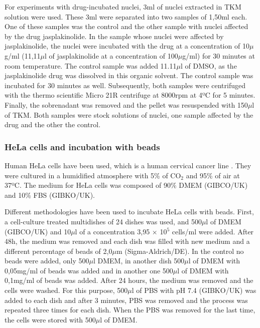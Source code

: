 \documentclass[12pt, a4paper]{article} %
\begin{document}
For experiments with drug-incubated nuclei, 3ml of nuclei extracted in TKM solution were used. These 3ml were separated into two samples of 1,50ml each. One of these samples was the control and the other sample with nuclei affected by the drug jasplakinolide. In the sample whose nuclei were affected by jasplakinolide, the nuclei were incubated with the drug at a concentration of 10$\mu$g/ml (11,11$\mu$l of jasplakinolide at a concentration of 100$\mu$g/ml) for 30 minutes at room temperature. The control sample was added 11.11$\mu$l of DMSO, as the jasplakinolide drug was dissolved in this organic solvent. The control sample was incubated for 30 minutes as well. Subsequently, both samples were centrifuged with the thermo scientific Micro 21R centrifuge at 8000rpm at 4ºC for 5 minutes. Finally, the sobrenadant was removed and the pellet was resuspended with 150$\mu$l of TKM. Both samples were stock solutions of nuclei, one sample affected by the drug and the other the control.

\setlength{\parskip}{0mm}

\subsubsection{HeLa cells and incubation with beads}

Human HeLa cells have been used, which is a human cervical cancer line \cite{gey1952tissue}. They were cultured in a humidified atmosphere with 5\% of CO$_{2}$ and 95\% of air at 37ºC. The medium for HeLa cells was composed of 90\% DMEM (GIBCO/UK) and 10\% FBS (GIBKO/UK).

\setlength{\parskip}{4mm}

Different methodologies have been used to incubate HeLa cells with beads. First, a cell-culture treated multidishes of 24 dishes was used, and 500$\mu$l of DMEM (GIBCO/UK) and 10$\mu$l of a concentration 3,95 $\times$ 10$^{5}$ cells/ml were added. After 48h, the medium was removed and each dish was filled with new medium and a different percentage of beads of 2,0$\mu$m (Sigma-Aldrich/DE). In the control no beads were added, only 500$\mu$l DMEM, in another dish 500$\mu$l of DMEM with 0,05mg/ml of beads was added and in another one 500$\mu$l of DMEM with 0,1mg/ml of beads was added. After 24 hours, the medium was removed and the cells were washed. For this purpose, 500$\mu$l of PBS with pH 7.4 (GIBKO/UK) was added to each dish and after 3 minutes, PBS was removed and the process was repeated three times for each dish. When the PBS was removed for the last time, the cells were stored with 500$\mu$l of DMEM.
\end{document}
